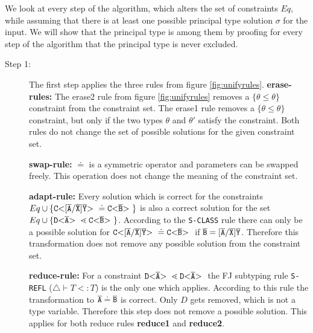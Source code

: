 \documentclass[runningheads]{llncs}
\begin{document}
We look at every step of the algorithm, which alters the set of constraints $Eq$,
while assuming that there is at least one possible principal type solution $\sigma$ for the input.
We will show that the principal type is among them by proofing for every step of the algorithm that the principal type is never excluded.


\begin{description}
\item[Step 1:]
The first step applies the three rules from figure \ref{fig:unifyrules}.
\textbf{erase-rules:} The erase2 rule from figure \ref{fig:unifyrules} removes a
$\{\theta \leq \theta\}$ constraint from the constraint set.
The erase1 rule removes a $\{\theta \leq \theta\}$ constraint,
but only if the two types $\theta$ and $\theta'$ satisfy the constraint.
Both rules do not change the set of possible solutions for the given constraint set.

\textbf{swap-rule:} $\doteq$ is a symmetric operator and parameters can be swapped freely.
This operation does not change the meaning of the constraint set.

\textbf{adapt-rule:} Every solution which is correct for the constraints
$Eq \cup \{  \mathtt{C {\tt <} [\overline{\tt A}/\overline{\tt X}]\overline{\tt Y} {\tt >} \ } \doteq \mathtt{C {\tt <} \overline{\tt B} {\tt >} \ } \}$ is also
a correct solution for the set $Eq \cup \{  \mathtt{D {\tt <} \overline{\tt A} {\tt >} \ } \lessdot \mathtt{C {\tt <} \overline{\tt B} {\tt >} \ } \}$.
According to the \texttt{S-CLASS} rule there can only be a possible solution for 
$\mathtt{C {\tt <} [\overline{\tt A}/\overline{\tt X}]\overline{\tt Y} {\tt >} \ } \doteq \mathtt{C {\tt <} \overline{\tt B} {\tt >} \ }$
if $\overline{\tt B} = [\overline{\tt A}/\overline{\tt X}]\overline{\tt Y}$.
Therefore this transformation does not remove any possible solution from the constraint set.

\textbf{reduce-rule:}
For a constraint $\mathtt{D {\tt <} \overline{\tt A} {\tt >} \ } \lessdot \mathtt{D {\tt <} \overline{\tt A} {\tt >} \ }$ the FJ subtyping rule \texttt{S-REFL} ($\triangle \vdash T <: T$) is the only one which applies.
According to this rule the transformation to $\overline{\tt A} \doteq \overline{\tt B}$ is correct.
Only $D$ gets removed, which is not a type variable.
Therefore this step does not remove a possible solution.
This applies for both reduce rules \textbf{reduce1} and \textbf{reduce2}.


\end{description}
\end{document}
